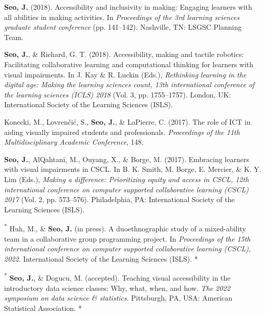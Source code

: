 \documentclass[11pt,a4paper,]{awesome-cv}
\newcommand{\CSLBlock}[1]{#1\hfill\break}
\begin{document}
\leavevmode{}%
\textbf{Seo, J.} (2018). Accessibility and inclusivity in making:
Engaging learners with all abilities in making activities. In
\emph{Proceedings of the 3rd learning sciences graduate student
conference} (pp. 141--142). Nashville, TN: LSGSC Planning Team.

\leavevmode{}%
\textbf{Seo, J.}, \& Richard, G. T. (2018). Accessibility, making and
tactile robotics: Facilitating collaborative learning and computational
thinking for learners with visual impairments. In J. Kay \& R. Luckin
(Eds.), \emph{Rethinking learning in the digital age: Making the
learning sciences count, 13th international conference of the learning
sciences (ICLS) 2018} (Vol. 3, pp. 1755--1757). London, UK:
International Society of the Learning Sciences (ISLS).

\leavevmode{}%
Konecki, M., Lovrenčić, S., \textbf{Seo, J.}, \& LaPierre, C. (2017).
The role of ICT in aiding visually impaired students and professionals.
\emph{Proceedings of the 11th Multidisciplinary Academic Conference},
148.

\leavevmode{}%
\textbf{Seo, J.}, AlQahtani, M., Ouyang, X., \& Borge, M. (2017).
Embracing learners with visual impairments in CSCL. In B. K. Smith, M.
Borge, E. Mercier, \& K. Y. Lim (Eds.), \emph{Making a difference:
Prioritizing equity and access in CSCL, 12th international conference on
computer supported collaborative learning (CSCL) 2017} (Vol. 2, pp.
573--576). Philadelphia, PA: International Society of the Learning
Sciences (ISLS).

\leavevmode{}%
\textsuperscript{*} Huh, M., \& \textbf{Seo, J.} (in press). A
duoethnographic study of a mixed-ability team in a collaborative group
programming project. In \emph{Proceedings of the 15th international
conference on computer supported collaborative learning (CSCL), 2022}.
International Society of the Learning Sciences (ISLS).
\CSLBlock{*}

\leavevmode{}%
\textsuperscript{*} \textbf{Seo, J.}, \& Dogucu, M. (accepted). Teaching
visual accessibility in the introductory data science classes: Why,
what, when, and how. \emph{The 2022 symposium on data science \&
statistics}. {Pittsburgh, PA, USA}: American Statistical Association.
\CSLBlock{*}
\end{document}
